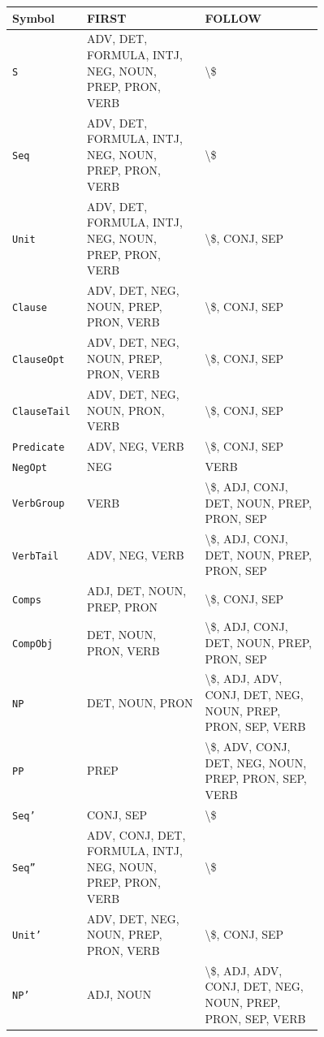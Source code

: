 \begin{longtable}{@{}l p{0.38\linewidth} p{0.38\linewidth}@{}}
\toprule
\textbf{Symbol} & \textbf{FIRST} & \textbf{FOLLOW} \\
\midrule
\endhead
\bottomrule
\endfoot
\texttt{S} & \small ADV, DET, FORMULA, INTJ, NEG, NOUN, PREP, PRON, VERB & \small \textbackslash{}\$ \\
\texttt{Seq} & \small ADV, DET, FORMULA, INTJ, NEG, NOUN, PREP, PRON, VERB & \small \textbackslash{}\$ \\
\texttt{Unit} & \small ADV, DET, FORMULA, INTJ, NEG, NOUN, PREP, PRON, VERB & \small \textbackslash{}\$, CONJ, SEP \\
\texttt{Clause} & \small ADV, DET, NEG, NOUN, PREP, PRON, VERB & \small \textbackslash{}\$, CONJ, SEP \\
\texttt{ClauseOpt} & \small ADV, DET, NEG, NOUN, PREP, PRON, VERB & \small \textbackslash{}\$, CONJ, SEP \\
\texttt{ClauseTail} & \small ADV, DET, NEG, NOUN, PRON, VERB & \small \textbackslash{}\$, CONJ, SEP \\
\texttt{Predicate} & \small ADV, NEG, VERB & \small \textbackslash{}\$, CONJ, SEP \\
\texttt{NegOpt} & \small NEG & \small VERB \\
\texttt{VerbGroup} & \small VERB & \small \textbackslash{}\$, ADJ, CONJ, DET, NOUN, PREP, PRON, SEP \\
\texttt{VerbTail} & \small ADV, NEG, VERB & \small \textbackslash{}\$, ADJ, CONJ, DET, NOUN, PREP, PRON, SEP \\
\texttt{Comps} & \small ADJ, DET, NOUN, PREP, PRON & \small \textbackslash{}\$, CONJ, SEP \\
\texttt{CompObj} & \small DET, NOUN, PRON, VERB & \small \textbackslash{}\$, ADJ, CONJ, DET, NOUN, PREP, PRON, SEP \\
\texttt{NP} & \small DET, NOUN, PRON & \small \textbackslash{}\$, ADJ, ADV, CONJ, DET, NEG, NOUN, PREP, PRON, SEP, VERB \\
\texttt{PP} & \small PREP & \small \textbackslash{}\$, ADV, CONJ, DET, NEG, NOUN, PREP, PRON, SEP, VERB \\
\texttt{Seq'} & \small CONJ, SEP & \small \textbackslash{}\$ \\
\texttt{Seq''} & \small ADV, CONJ, DET, FORMULA, INTJ, NEG, NOUN, PREP, PRON, VERB & \small \textbackslash{}\$ \\
\texttt{Unit'} & \small ADV, DET, NEG, NOUN, PREP, PRON, VERB & \small \textbackslash{}\$, CONJ, SEP \\
\texttt{NP'} & \small ADJ, NOUN & \small \textbackslash{}\$, ADJ, ADV, CONJ, DET, NEG, NOUN, PREP, PRON, SEP, VERB \\
\end{longtable}
